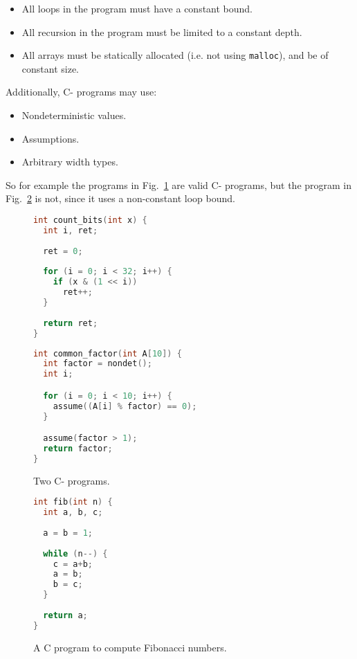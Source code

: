 \documentclass[a4paper]{llncs}
\begin{document}
\begin{itemize}
 \item All loops in the program must have a constant bound.
 \item All recursion in the program must be limited to a constant depth.
 \item All arrays must be statically allocated (i.e. not using \texttt{malloc}),
 and be of constant size.
\end{itemize}

Additionally, C- programs may use:

\begin{itemize}
 \item Nondeterministic values.
 \item Assumptions.
 \item Arbitrary width types.
\end{itemize}

So for example the programs in Fig.~\ref{fig:c-} are valid
C- programs, but the program in Fig.~\ref{fig:not-c-} is not, since it uses
a non-constant loop bound.

\begin{figure}
\begin{minipage}[scale=0.8]{0.45\linewidth}
 \begin{lstlisting}[language=c]
int count_bits(int x) {
  int i, ret;
  
  ret = 0;
  
  for (i = 0; i < 32; i++) {
    if (x & (1 << i))
      ret++;
  }
  
  return ret;
}
 \end{lstlisting}
\end{minipage}
\begin{minipage}{0.54\linewidth}
 \begin{lstlisting}[language=C]
int common_factor(int A[10]) {
  int factor = nondet();
  int i;

  for (i = 0; i < 10; i++) {
    assume((A[i] % factor) == 0);
  }

  assume(factor > 1);
  return factor;
}

 \end{lstlisting}
\end{minipage}

 \label{fig:c-}
 \caption{Two C- programs.}
\end{figure}

\begin{figure}
 \begin{lstlisting}[language=C]
int fib(int n) {
  int a, b, c;
  
  a = b = 1;
  
  while (n--) {
    c = a+b;
    a = b;
    b = c;
  }
  
  return a;
}
 \end{lstlisting}

 \label{fig:not-c-}
 \caption{A C program to compute Fibonacci numbers.}
\end{figure}
\end{document}
